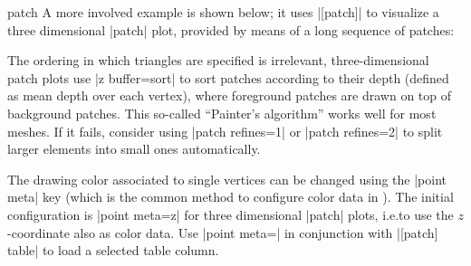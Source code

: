 {\begin{plottype}[/pgfplots]{patch}
    A more involved example is shown below; it uses |[patch]| to
    visualize a three dimensional |patch| plot, provided by means of a long
    sequence of patches:
\pgfplotsexpensiveexample
\begin{codeexample}[]
\end{codeexample}
    \noindent The ordering in which triangles are specified is irrelevant,
    three-dimensional patch plots use |z buffer=sort| to sort patches according
    to their depth (defined as mean depth over each vertex), where foreground
    patches are drawn on top of background patches. This so-called ``Painter's
    algorithm'' works well for most meshes. If it fails, consider using
    |patch refines=1| or |patch refines=2| to split larger elements into small
    ones automatically.

    The drawing color associated to single vertices can be changed using the
    |point meta| key (which is the common method to configure color data in
    \PGFPlots). The initial configuration is |point meta=z| for three
    dimensional |patch| plots, i.e.\@ to use the $z$-coordinate also as color
    data. Use |point meta=\thisrow| in conjunction with
    |[patch] table| to load a selected table column.


\end{plottype}}

